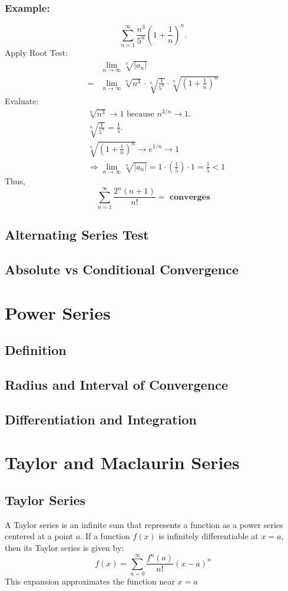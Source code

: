 \documentclass[11pt]{article}
\begin{document}
\subsubsection*{Example:}
\[
  \sum_{n=1}^{\infty} \frac{n^3}{5^n} \left(1+\frac{1}{n}\right)^{n}.
\]
Apply Root Test:
\[
  \begin{aligned}
    &\lim_{n\to\infty}\sqrt[n]{|a_n|}\\
    =&\lim_{n\to\infty}\sqrt[n]{n^3} \cdot \sqrt[n]{\frac{1}{5^n}} \cdot \sqrt[n]{\left(1+\frac{1}{n}\right)^{n}}
  \end{aligned}
\]
Evaluate:
\[
  \begin{aligned}
    &\sqrt[n]{n^3} \to 1\text{ because } n^{3/n} \to 1.\\[10pt]
    &\sqrt[n]{\frac{1}{5^n}} = \frac{1}{5}.\\[10pt]
    &\sqrt[n]{\left(1+\frac{1}{n}\right)^{n}} \to e^{1/n} \to 1\\[10pt]
    &\Rightarrow\lim_{n\to\infty}\sqrt[n]{|a_n|}=1 \cdot \left(\frac{1}{5}\right) \cdot 1 = \frac{1}{5}<1
  \end{aligned}
\]
Thus,
\[
  \sum_{n=1}^\infty \frac{2^n(n+1)}{n!}=\textbf{ converges}
\]
\subsection{Alternating Series Test}
\subsection{Absolute vs Conditional Convergence}
\section{Power Series}
\subsection{Definition}
\subsection{Radius and Interval of Convergence}
\subsection{Differentiation and Integration}
\section{Taylor and Maclaurin Series}
\subsection{Taylor Series}
A Taylor series is an infinite sum that represents a function as a power series centered at a point $a$. If a function $f(x)$ is infinitely differentiable at $x = a$, then its Taylor series is given by:
\[
  f(x)=\sum_{n=0}^\infty\frac{f^n(a)}{n!}(x-a)^n
\]
This expansion approximates the function near $x=a$
\end{document}
